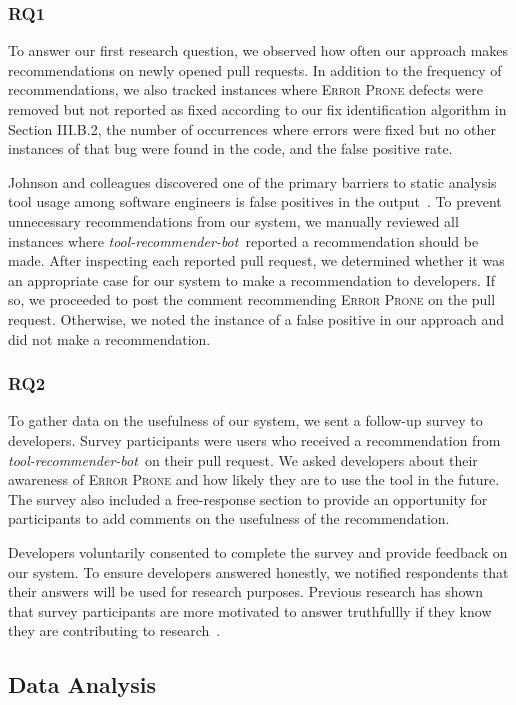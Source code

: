 \documentclass[sigconf,review,anonymous]{acmart}
\newcommand{\tool}{\textsl{tool-recommender-bot}}
\begin{document}
\subsubsection{RQ1}

To answer our first research question, we observed how often our approach makes recommendations on newly opened pull requests. In addition to the frequency of recommendations, we also tracked instances where \textsc{Error Prone} defects were removed but not reported as fixed according to our fix identification algorithm in Section III.B.2, the number of occurrences where errors were fixed but no other instances of that bug were found in the code, and the false positive rate.

Johnson and colleagues discovered one of the primary barriers to static analysis tool usage among software engineers is false positives in the output~\cite{Johnson2013Why}. To prevent unnecessary recommendations from our system, we manually reviewed all instances where \tool~reported a recommendation should be made. After inspecting each reported pull request, we determined whether it was an appropriate case for our system to make a recommendation to developers. If so, we proceeded to post the comment recommending \textsc{Error Prone} on the pull request. Otherwise, we noted the instance of a false positive in our approach and did not make a recommendation.

\subsubsection{RQ2}

To gather data on the usefulness of our system, we sent a follow-up survey to developers. Survey participants were users who received a recommendation from \tool~on their pull request. We asked developers about their awareness of \textsc{Error Prone} and how likely they are to use the tool in the future. The survey also included a free-response section to provide an opportunity for participants to add comments on the usefulness of the recommendation.

Developers voluntarily consented to complete the survey and provide feedback on our system. To ensure developers answered honestly, we notified respondents that their answers will be used for research purposes. Previous research has shown that survey participants are more motivated to answer truthfullly if they know they are contributing to research~\cite{Krosnick1991Research}.

\subsection{Data Analysis}
\end{document}
